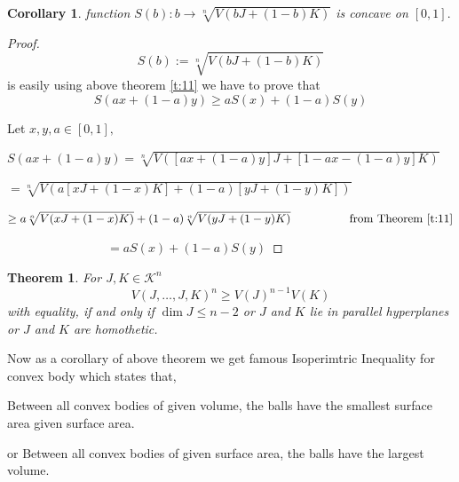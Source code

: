 \documentclass[oneside]{book}
\newtheorem{theorem}{Theorem}[section]
\newtheorem{corollary}{Corollary}[theorem]
\begin{document}
	\begin{corollary}
		
		function $ S(b):b\rightarrow \sqrt[n]{V(bJ+(1-b)K)}$  is concave on $[0,1] .$ 
	\end{corollary}
	\begin{proof}
		
		\[
		S(b):=\sqrt[n]{V(b J+(1-b) K)}
		\] 
		is  easily using above theorem \ref{t:11}
		\hfill \break
		we have to prove that 
		$$ S(a x+(1-a) y) \geq a S(x)+(1-a) S(y) $$
		
		Let $x, y, a \in[0,1],$ 
		
		\hfill \break
		
		$  S(ax+(1-a)y)  =\sqrt[n]{V([ax+(1-a)y] J+[1-a x-(1-a) y] K)}$
		
		\hfill \break
		
		\quad \quad \quad \quad \quad \quad \quad \quad 
		$=\sqrt[n]{V(a[x J+(1-x) K]+(1-a)[y J+(1-y) K])}$
		
		\hfill \break
		
		\quad \quad \quad \quad \quad \quad \quad \quad   $
		\geq a \sqrt[n]{V(x J+(1-x) K)}+(1-a) \sqrt[n]{V(y J+(1-y) K)}
		\quad \quad \quad \quad \quad \text{from Theorem } \ref{t:11}$
		
		\hfill \break
		
		$ \quad \quad \quad \quad \quad  \quad  \quad \quad = a S(x)+(1-a) S(y)$
	\end{proof}
	
	
	
	
	
	
	
	
	
	
	
	
	
	
	\begin{theorem}
		\label{t:12}
		For $J, K \in \mathcal{K}^{n}$
		\[
		V(J, \ldots, J, K)^{n} \geq V(J)^{n-1} V(K)
		\]
		with equality, if and only if $\operatorname{dim} J \leq n-2$ or $J$ and $K$ lie in parallel hyperplanes or $J$ and $K$ are homothetic.
		\\
	\end{theorem} 
	Now as a corollary of above theorem we get famous Isoperimtric Inequality for convex body 
	which states that, 
	
	\hfill \break
	
	Between all convex bodies of given volume, the balls have the smallest surface area given surface area. 
	
	\quad\quad\quad\quad\quad\quad\quad\quad\quad\quad\quad\quad\quad\quad
	or 
	\hfill \break
	Between all convex bodies of given surface area, the balls have the largest volume.
	
\end{document}
